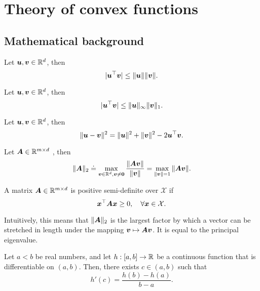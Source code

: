 \section{Theory of convex functions}

\subsection{Mathematical background}

\begin{theorem}
    Let $\bm{u},\bm{v}\in \mathbb{R}^d$, then \[
        |\bm{u}^\top \bm{v}| \leq \|\bm{u}\| \|\bm{v}\|.
    \]
\end{theorem}

\begin{theorem}
    Let $\bm{u}, \bm{v} \in \mathbb{R}^d$, then \[
        |\bm{u}^\top \bm{v}| \leq \| \bm{u} \|_\infty \| \bm{v} \|_1.
    \]
\end{theorem}

\begin{theorem}
    Let $\bm{u}, \bm{v} \in \mathbb{R}^d$, then \[
        \| \bm{u} - \bm{v} \|^2 = \| \bm{u} \|^2 + \| \bm{v} \|^2 - 2 \bm{u}^\top\bm{v}.
    \]
\end{theorem}

\begin{definition}
    Let $\bm{A} \in \mathbb{R}^{m \times d}$ , then \[
        \|\bm{A}\|_2 \doteq \max_{\bm{v}\in \mathbb{R}^d, \bm{v}\neq \bm{0}} \frac{\|\bm{A}\bm{v}\|}{\|\bm{v}\|} = \max_{\|\bm{v}\| = 1} \|\bm{A}\bm{v}\|.
    \]
\end{definition}

\begin{definition}
    A matrix $\bm{A} \in \mathbb{R}^{m \times d}$ is positive semi-definite over $\mathcal{X}$ if \[
        \bm{x}^\top \bm{A} \bm{x} \geq 0, \quad \forall \bm{x} \in \mathcal{X}.
    \]
\end{definition}

Intuitively, this means that $\|\bm{A}\|_2$ is the largest factor by which a vector can be
stretched in length under the mapping $\bm{v}\mapsto\bm{A}\bm{v}$. It is equal to the principal
eigenvalue.

\begin{theorem}
    Let $a<b$ be real numbers, and let $h: [a,b]\to \mathbb{R}$ be a continuous function that is differentiable
    on $(a,b)$. Then, there exists $c\in(a,b)$ such that \[
        h'(c) = \frac{h(b) - h(a)}{b-a}.
    \]
\end{theorem}

